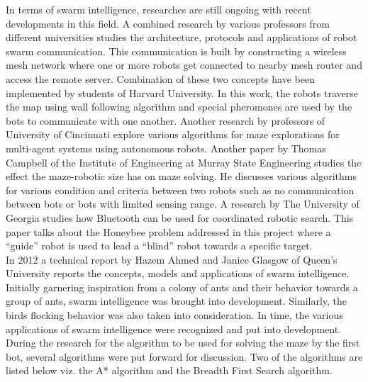 In terms of swarm intelligence, researches are still ongoing with recent developments
in this field. A combined research by various professors from different universities studies the architecture, protocols and applications of robot swarm communication.
This communication is built by constructing a wireless mesh network where one or
more robots get connected to nearby mesh router and access the remote server.
Combination of these two concepts have been implemented by students of Harvard
University. In this work, the robots traverse the map using wall following algorithm
and special pheromones are used by the bots to communicate with one another.
Another research by professors of University of Cincinnati explore various
algorithms for maze explorations for multi-agent systems using autonomous robots.
Another paper by Thomas Campbell of the Institute of Engineering at Murray State
Engineering studies the effect the maze-robotic size has on maze solving. He discusses
various algorithms for various condition and criteria between two robots such as no
communication between bots or bots with limited sensing range.
A research by The University of Georgia\cite{odin} studies how Bluetooth can be used for
coordinated robotic search. This paper talks about the Honeybee problem
addressed in this project where a “guide” robot is used to lead a “blind” robot
towards a specific target.\\
In 2012 a technical report by Hazem Ahmed and Janice Glasgow of Queen's University reports the concepts, models and applications of swarm intelligence. Initially garnering inspiration from a colony of ants and their behavior towards a group of ants, swarm intelligence was brought into development. Similarly, the birds flocking behavior was also taken into consideration. In time, the various applications of swarm intelligence were recognized and put into development.\\
During the research for the algorithm to be used for solving the maze by the first bot, several algorithms were put forward for discussion. Two of the algorithms are listed below viz. the A* algorithm and the Breadth First Search algorithm.
